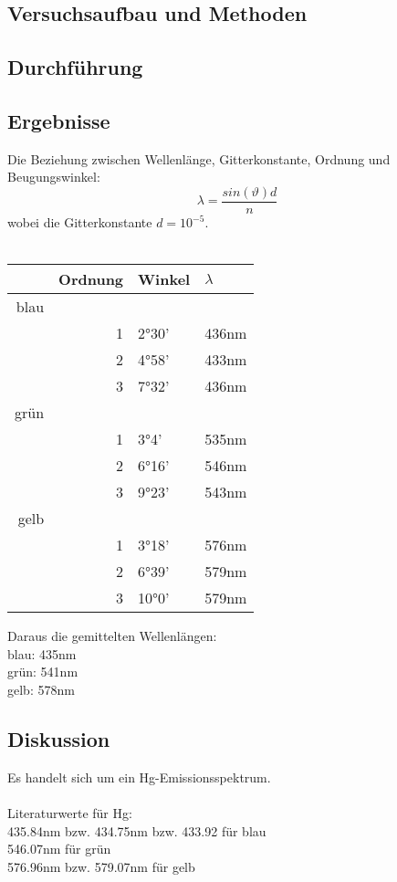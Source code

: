 \documentclass{article}
\begin{document}
\subsection{Versuchsaufbau und Methoden}
\subsection{Durchführung}
\subsection{Ergebnisse}
Die Beziehung zwischen Wellenlänge, Gitterkonstante, Ordnung und Beugungswinkel:\\
$$\lambda=\frac{sin(\vartheta)d}{n}$$
wobei die Gitterkonstante $d=10^{-5}$.\\
\\
\begin{center}
\begin{tabular}{|r|r|l|l|}
\hline
& Ordnung & Winkel & $\lambda$\\
\hline
blau & & &\\
& 1 & 2°30' & 436nm\\
& 2 & 4°58' & 433nm\\
& 3 & 7°32' & 436nm\\
\hline
grün & & &\\
& 1 & 3°4' & 535nm\\
& 2 & 6°16' & 546nm\\
& 3 & 9°23' & 543nm\\
\hline
gelb & & &\\
& 1 & 3°18' & 576nm\\
& 2 & 6°39' & 579nm\\
& 3 & 10°0' & 579nm\\
\hline
\end{tabular}
\end{center}
\vspace{0.8cm}
Daraus die gemittelten Wellenlängen:\\
blau: 435nm\\
grün: 541nm\\
gelb: 578nm\\

\subsection{Diskussion}
Es handelt sich um ein Hg-Emissionsspektrum.\\
\\
Literaturwerte für Hg:\\
435.84nm bzw. 434.75nm bzw. 433.92 für blau\\
546.07nm für grün\\
576.96nm bzw. 579.07nm für gelb\\
\end{document}
